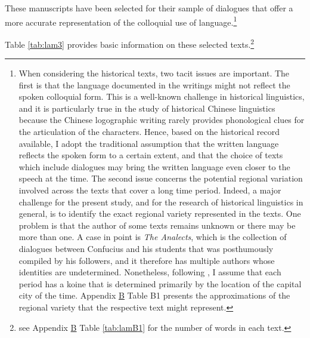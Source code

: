\documentclass[output=paper]{langscibook}
\begin{document}
These manuscripts have been selected for their sample of dialogues that offer a more accurate representation of the colloquial use of language.\footnote{When considering the historical texts, two tacit issues are important. The first is that the language documented in the writings might not reflect the spoken colloquial form. This is a well-known challenge in historical linguistics, and it is particularly true in the study of historical Chinese linguistics because the Chinese logographic writing rarely provides phonological clues for the articulation of the characters. Hence, based on the historical record available, I adopt the traditional assumption that the written language reflects the spoken form to a certain extent, and that the choice of texts which include dialogues may bring the written language even closer to the speech at the time. The second issue concerns the potential regional variation involved across the texts that cover a long time period. Indeed, a major challenge for the present study, and for the research of historical linguistics in general, is to identify the exact regional variety represented in the texts. One problem is that the author of some texts remains unknown or there may be more than one. A case in point is \emph{The Analects}, which is the collection of dialogues between Confucius and his students that was posthumously compiled by his followers, and it therefore has multiple authors whose identities are undetermined. Nonetheless, following \cite{TaiChan1999}, I assume that each period has a koine that is determined primarily by the location of the capital city of the time. Appendix \hyperlink{app:lamB}{B} Table B1 presents the approximations of the regional variety that the respective text might represent.} 

Table \ref{tab:lam3} provides basic information on these selected texts.\footnote{see Appendix \hyperlink{app:lamB}{B} Table \ref{tab:lamB1} for the number of words in each text.} 
\end{document}
